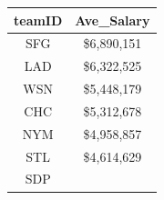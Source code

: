 \documentclass[]{book}
\theoremstyle{definition}
\theoremstyle{definition}
\theoremstyle{definition}
\theoremstyle{remark}
\begin{document}
\begin{longtable}[]{@{}cc@{}}
\toprule
\begin{minipage}[b]{0.12\columnwidth}\centering
teamID\strut
\end{minipage} & \begin{minipage}[b]{0.17\columnwidth}\centering
Ave\_Salary\strut
\end{minipage}\tabularnewline
\midrule
\endhead
\begin{minipage}[t]{0.12\columnwidth}\centering
SFG\strut
\end{minipage} & \begin{minipage}[t]{0.17\columnwidth}\centering
\$6,890,151\strut
\end{minipage}\tabularnewline
\begin{minipage}[t]{0.12\columnwidth}\centering
LAD\strut
\end{minipage} & \begin{minipage}[t]{0.17\columnwidth}\centering
\$6,322,525\strut
\end{minipage}\tabularnewline
\begin{minipage}[t]{0.12\columnwidth}\centering
WSN\strut
\end{minipage} & \begin{minipage}[t]{0.17\columnwidth}\centering
\$5,448,179\strut
\end{minipage}\tabularnewline
\begin{minipage}[t]{0.12\columnwidth}\centering
CHC\strut
\end{minipage} & \begin{minipage}[t]{0.17\columnwidth}\centering
\$5,312,678\strut
\end{minipage}\tabularnewline
\begin{minipage}[t]{0.12\columnwidth}\centering
NYM\strut
\end{minipage} & \begin{minipage}[t]{0.17\columnwidth}\centering
\$4,958,857\strut
\end{minipage}\tabularnewline
\begin{minipage}[t]{0.12\columnwidth}\centering
STL\strut
\end{minipage} & \begin{minipage}[t]{0.17\columnwidth}\centering
\$4,614,629\strut
\end{minipage}\tabularnewline
\begin{minipage}[t]{0.12\columnwidth}\centering
SDP\strut
\end{minipage} & \begin{minipage}[t]{0.17\columnwidth}\centering

\end{minipage}
\end{longtable}
\end{document}
